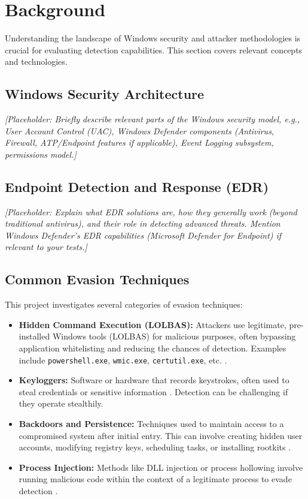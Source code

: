 \documentclass{ULBreport}
\begin{document}
\section*{Background}
Understanding the landscape of Windows security and attacker methodologies is crucial for evaluating detection capabilities. This section covers relevant concepts and technologies.

\subsection{Windows Security Architecture}
\textit{[Placeholder: Briefly describe relevant parts of the Windows security model, e.g., User Account Control (UAC), Windows Defender components (Antivirus, Firewall, ATP/Endpoint features if applicable), Event Logging subsystem, permissions model.]}

\subsection{Endpoint Detection and Response (EDR)}
\textit{[Placeholder: Explain what EDR solutions are, how they generally work (beyond traditional antivirus), and their role in detecting advanced threats. Mention Windows Defender's EDR capabilities (Microsoft Defender for Endpoint) if relevant to your tests.]}

\subsection{Common Evasion Techniques}
This project investigates several categories of evasion techniques:
\begin{itemize}
	\item \textbf{Hidden Command Execution (LOLBAS):} Attackers use legitimate, pre-installed Windows tools (LOLBAS) for malicious purposes, often bypassing application whitelisting and reducing the chances of detection. Examples include \texttt{powershell.exe}, \texttt{wmic.exe}, \texttt{certutil.exe}, etc. \cite{lolbas}.
	\item \textbf{Keyloggers:} Software or hardware that records keystrokes, often used to steal credentials or sensitive information \cite{malwarebytes_keyloggers}. Detection can be challenging if they operate stealthily.
	\item \textbf{Backdoors and Persistence:} Techniques used to maintain access to a compromised system after initial entry. This can involve creating hidden user accounts, modifying registry keys, scheduling tasks, or installing rootkits \cite{offensive_security_backdoors, mitre_t1053}.
	\item \textbf{Process Injection:} Methods like DLL injection or process hollowing involve running malicious code within the context of a legitimate process to evade detection \cite{mandiant_hollowing, redteam_dll}.
\end{itemize}
\end{document}
